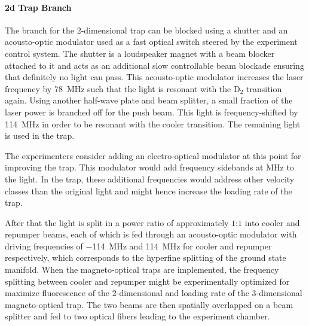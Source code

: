 \paragraph{2d Trap Branch} The branch for the 2-dimensional trap can be blocked using a shutter and an acousto-optic modulator used as a fast optical switch steered by the experiment control system. The shutter is a loudspeaker magnet with a beam blocker attached to it and acts as an additional slow controllable beam blockade ensuring that definitely no light can pass. This acousto-optic modulator increases the laser frequency by \SI{+78}{\mega\hertz} such that the light is resonant with the D$_2$ transition again. Using another half-wave plate and beam splitter, a small fraction of the laser power is branched off for the push beam. This light is frequency-shifted by \SI{+114}{\mega\hertz} in order to be resonant with the cooler transition. The remaining light is used in the trap.

The experimenters consider adding an electro-optical modulator at this point for improving the trap. This modulator would add frequency sidebands at \si{\mega\hertz} to the light. In the trap, these additional frequencies would address other velocity classes than the original light and might hence increase the loading rate of the trap.

After that the light is split in a power ratio of approximately $1$:$1$ into cooler and repumper beams, each of which is fed through an acousto-optic modulator with driving frequencies of \SI{-114}{\mega\hertz} and \SI{+114}{\mega\hertz} for cooler and repumper respectively, which corresponds to the hyperfine splitting of the ground state manifold. When the magneto-optical traps are implemented, the frequency splitting between cooler and repumper might be experimentally optimized for maximize fluorescence of the 2-dimensional and loading rate of the 3-dimensional magneto-optical trap. The two beams are then spatially overlapped on a beam splitter and fed to two optical fibers leading to the experiment chamber.

